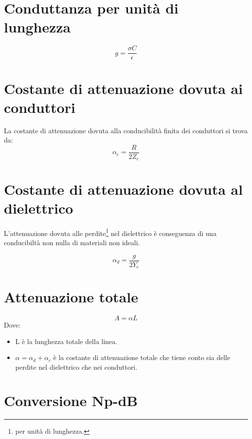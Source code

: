\documentclass[10pt,a4paper]{report}
\begin{document}
	\section{Conduttanza per unità di lunghezza}

			\begin{equation}
			g=\frac{\sigma C}{\epsilon}
			\end{equation}





	\section{Costante di attenuazione dovuta ai conduttori}
	
			La costante di attenuazione dovuta alla conducibilità finita dei conduttori si trova da:
			\begin{equation}
			\alpha_c=\frac{R}{2Z_c}
			\end{equation}
		
	\section{Costante di attenuazione dovuta al dielettrico}
	
			L'attenuazione dovuta alle perdite\footnote{per unità di lunghezza.} nel dielettrico è conseguenza di una conducibiltà non nulla di materiali non ideali.

			\begin{equation}
			\alpha_d=\frac{g}{2Y_c}
			\end{equation}

	\section{Attenuazione totale}

			\begin{equation}
			A=\alpha L
			\end{equation}
			Dove:
			\begin{itemize}
			\item L è la lunghezza totale della linea.
			\item $\alpha=\alpha_d+\alpha_c$ è la costante di attenuazione totale che tiene conto sia delle perdite nel dielettrico che nei conduttori.
			\end{itemize}

	\section{Conversione Np-dB}
\end{document}
